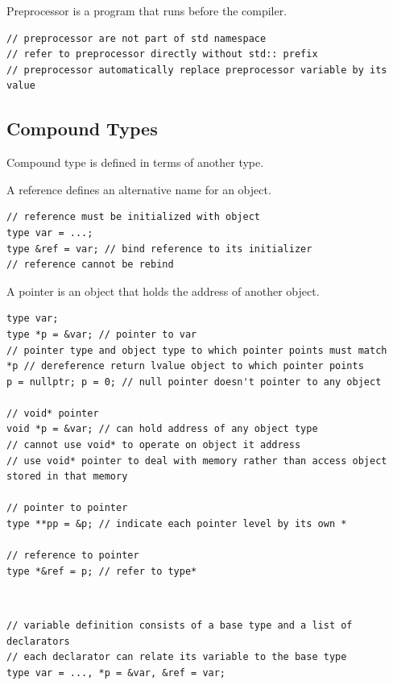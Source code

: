 \documentclass{blog}
\begin{document}
\begin{definition}[preprocessor]
    Preprocessor is a program that runs before the compiler.
    \begin{verbatim}
// preprocessor are not part of std namespace
// refer to preprocessor directly without std:: prefix
// preprocessor automatically replace preprocessor variable by its value
\end{verbatim}
\end{definition}

\subsection{Compound Types}
\begin{definition}
    Compound type is defined in terms of another type.
\end{definition}

\begin{definition}[reference]
    A reference defines an alternative name for an object.
    \begin{verbatim}
// reference must be initialized with object
type var = ...;
type &ref = var; // bind reference to its initializer
// reference cannot be rebind
\end{verbatim}
\end{definition}

\begin{definition}[pointer]
    A pointer is an object that holds the address of another object.
    \begin{verbatim}
type var;
type *p = &var; // pointer to var
// pointer type and object type to which pointer points must match
*p // dereference return lvalue object to which pointer points
p = nullptr; p = 0; // null pointer doesn't pointer to any object

// void* pointer
void *p = &var; // can hold address of any object type
// cannot use void* to operate on object it address
// use void* pointer to deal with memory rather than access object stored in that memory

// pointer to pointer
type **pp = &p; // indicate each pointer level by its own *

// reference to pointer
type *&ref = p; // refer to type*
\end{verbatim}
\end{definition}

\begin{definition}~
    \begin{verbatim}
// variable definition consists of a base type and a list of declarators
// each declarator can relate its variable to the base type
type var = ..., *p = &var, &ref = var;
\end{verbatim}
\end{definition}
\end{document}

